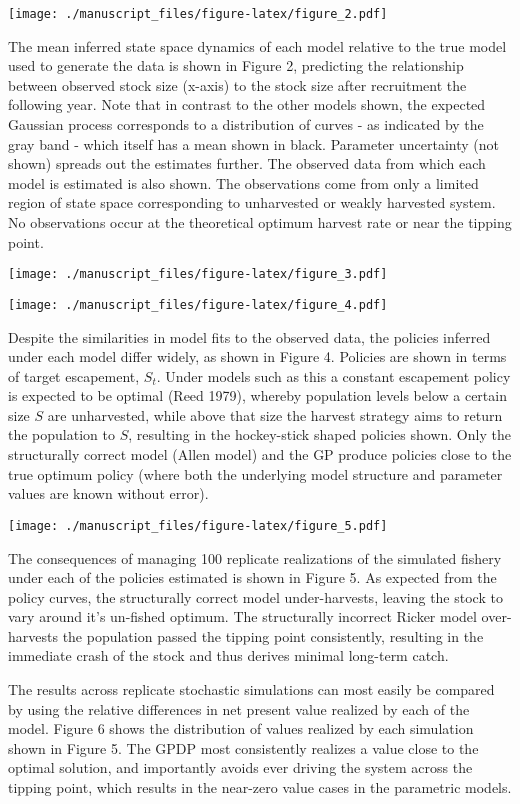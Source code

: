 \documentclass[]{components/elsarticle}
\begin{document}
\texttt{[image: ./manuscript\_files/figure-latex/figure\_2.pdf]}

The mean inferred state space dynamics of each model relative to the
true model used to generate the data is shown in Figure 2, predicting
the relationship between observed stock size (x-axis) to the stock size
after recruitment the following year. Note that in contrast to the other
models shown, the expected Gaussian process corresponds to a
distribution of curves - as indicated by the gray band - which itself
has a mean shown in black. Parameter uncertainty (not shown) spreads out
the estimates further. The observed data from which each model is
estimated is also shown. The observations come from only a limited
region of state space corresponding to unharvested or weakly harvested
system. No observations occur at the theoretical optimum harvest rate or
near the tipping point.

\texttt{[image: ./manuscript\_files/figure-latex/figure\_3.pdf]}

\texttt{[image: ./manuscript\_files/figure-latex/figure\_4.pdf]}

Despite the similarities in model fits to the observed data, the
policies inferred under each model differ widely, as shown in Figure 4.
Policies are shown in terms of target escapement, $S_t$. Under models
such as this a constant escapement policy is expected to be optimal
(Reed 1979), whereby population levels below a certain size $S$ are
unharvested, while above that size the harvest strategy aims to return
the population to $S$, resulting in the hockey-stick shaped policies
shown. Only the structurally correct model (Allen model) and the GP
produce policies close to the true optimum policy (where both the
underlying model structure and parameter values are known without
error).

\texttt{[image: ./manuscript\_files/figure-latex/figure\_5.pdf]}

The consequences of managing 100 replicate realizations of the simulated
fishery under each of the policies estimated is shown in Figure 5. As
expected from the policy curves, the structurally correct model
under-harvests, leaving the stock to vary around it's un-fished optimum.
The structurally incorrect Ricker model over-harvests the population
passed the tipping point consistently, resulting in the immediate crash
of the stock and thus derives minimal long-term catch.

The results across replicate stochastic simulations can most easily be
compared by using the relative differences in net present value realized
by each of the model. Figure 6 shows the distribution of values realized
by each simulation shown in Figure 5. The GPDP most consistently
realizes a value close to the optimal solution, and importantly avoids
ever driving the system across the tipping point, which results in the
near-zero value cases in the parametric models.
\end{document}
